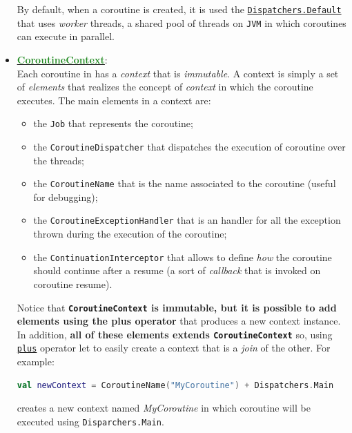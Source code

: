 \begin{itemize}
	By default, when a coroutine is created, it is used the \href{https://kotlinlang.org/api/kotlinx.coroutines/kotlinx-coroutines-core/kotlinx.coroutines/-dispatchers/-default.html}{\texttt{Dispatchers.Default}} that uses \textit{worker} threads, a shared pool of threads on \texttt{JVM} in which coroutines can execute in parallel. 
	
	\item \href{https://kotlinlang.org/api/latest/jvm/stdlib/kotlin.coroutines/-coroutine-context/}{\underline{\textbf{\textcolor{ForestGreen}{CoroutineContext}}}}:\\
	Each coroutine in \Kotlin has a \textit{context} that is \textit{immutable}. A context is simply a set of \textit{elements} that realizes the concept of \textit{context} in which the coroutine executes.
	The main elements in a context are:
	\begin{itemize}
		\item the \texttt{Job} that represents the coroutine;
		\item the \texttt{CoroutineDispatcher} that dispatches the execution of coroutine over the threads;
		\item the \texttt{CoroutineName} that is the name associated to the coroutine (useful for debugging);
		\item the \texttt{CoroutineExceptionHandler} that is an handler for all the exception thrown during the execution of the coroutine;
		\item the \texttt{ContinuationInterceptor} that allows to define \textit{how} the coroutine should continue after a resume (a sort of \textit{callback} that is invoked on coroutine resume).
	\end{itemize}
	
	Notice that \textbf{\texttt{CoroutineContext} is immutable, but it is possible to add elements using the plus operator} that produces a new context instance. In addition, \textbf{all of these elements extends \texttt{CoroutineContext}} so, using \href{https://kotlinlang.org/api/latest/jvm/stdlib/kotlin.coroutines/-coroutine-context/plus.html}{\texttt{plus}} operator let to easily create a context that is a \textit{join} of the other.
	For example:
	\begin{lstlisting}[language=Kotlin,numbers=none]
		val newContext = CoroutineName("MyCoroutine") + Dispatchers.Main
	\end{lstlisting}
	creates a new context named \textit{MyCoroutine} in which coroutine will be executed using \texttt{Disparchers.Main}.
	

\end{itemize}
